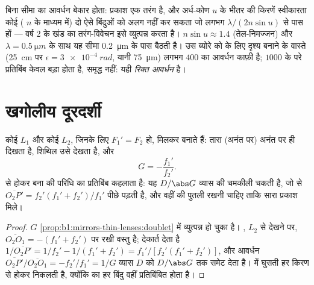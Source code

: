 \begin{remark}[विभेदन की सीमा]\label{rem:b1:optical-instruments:abbe}
बिना सीमा का आवर्धन बेकार होता: प्रकाश एक तरंग है, और अर्ध-कोण $u$ के भीतर की
किरणें स्वीकारता कोई  ( $n$ के माध्यम में) दो ऐसे
बिंदुओं को अलग नहीं कर सकता जो लगभग
$\lambda/(2n\sin u)$ से पास हों --- वर्ष 2 के खंड का तरंग-विवेचन इसे
व्युत्पन्न करता है। $n\sin u \approx 1.4$ (तेल-निमज्जन) और $\lambda =
\qty{0.5}{\micro m}$ के साथ यह सीमा \qty{0.2}{\micro m} के पास बैठती है। उस
ब्योरे को  के लिए दृश्य बनाने के वास्ते (\qty{25}{cm} पर
$\epsilon = \qty{3e-4}{rad}$, यानी \qty{75}{\micro m}) लगभग $400$ का आवर्धन
काफ़ी है; $1000$ के परे प्रतिबिंब केवल बड़ा होता है, समृद्ध नहीं: यही
\emph{रिक्त आवर्धन} है।
\end{remark}

\section{खगोलीय दूरदर्शी}

\begin{proposition}\label{prop:b1:optical-instruments:telescope}
कोई  $L_1$ और कोई  $L_2$, जिनके लिए $F_1' = F_2$ हो, मिलकर
 बनाते हैं: तारा (अनंत पर) अनंत पर ही दिखता है, शिथिल  उसे देखता है, और
\[
G = -\frac{f_1'}{f_2'} .
\]
 से होकर बना  की परिधि का प्रतिबिंब \emph{}
कहलाता है: यह $D/\abs G$ व्यास की चमकीली चकती है, जो  से
$\overline{O_2P'} = f_2'(f_1' + f_2')/f_1'$ पीछे पड़ती है, और वहीं  की
पुतली रखनी चाहिए ताकि सारा प्रकाश मिले।
\end{proposition}

\begin{proof}
$G$ \cref{prop:b1:mirrors-thin-lenses:doublet} में व्युत्पन्न हो चुका है।
, $L_2$ से देखने पर, $\overline{O_2O_1} = -(f_1'
+ f_2')$ पर रखी वस्तु है; देकार्त देता है $1/\overline{O_2P'} = 1/f_2' - 1/(f_1' + f_2')
= f_1'/[f_2'(f_1' + f_2')]$, और आवर्धन $\overline{O_2P'}/
\overline{O_2O_1} = -f_2'/f_1' = 1/G$ व्यास $D$ को
$D/\abs G$ तक समेट देता है।  में घुसती हर किरण  से होकर
निकलती है, क्योंकि  का हर बिंदु वहीं प्रतिबिंबित होता है।
\end{proof}

